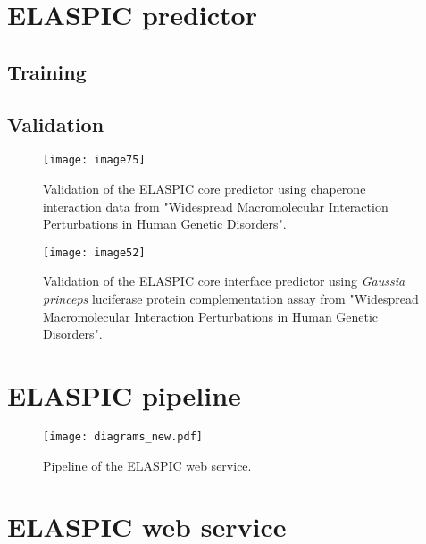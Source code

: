
\section{ELASPIC predictor}

\subsection{Training}

\subsection{Validation}

\begin{figure}[H]
	\centering
	\texttt{[image: image75]}
	\caption[Core Validation]{Validation of the ELASPIC core predictor using chaperone interaction data from "Widespread Macromolecular Interaction Perturbations in Human Genetic Disorders".}
\end{figure}

\begin{figure}[H]
	\centering
	\texttt{[image: image52]}
	\caption[Interface Validation]{Validation of the ELASPIC core interface predictor using \textit{Gaussia princeps} luciferase protein complementation assay from "Widespread Macromolecular Interaction Perturbations in Human Genetic Disorders".}
\end{figure}



\section{ELASPIC pipeline}

\begin{figure}[H]
	\centering
	\texttt{[image: diagrams\_new.pdf]}
	\caption[pipeline]{Pipeline of the ELASPIC web service.}
\end{figure}



\section{ELASPIC web service}


